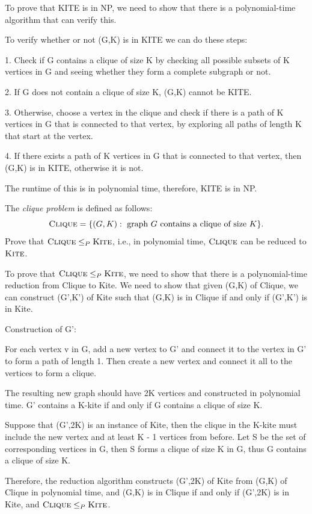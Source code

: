 \documentclass[12pt]{article}
\newcommand{\KITE}{\textsf{\sc Kite}}
\newcommand{\CLIQUE}{\textsf{\sc Clique}}
\newcounter{ques}
\newenvironment{question}{\stepcounter{ques}{\noindent\bf Question \arabic{ques}:}}{\vspace{5mm}}
\newenvironment{solution}{{\noindent\bf Solution:}}{\vspace{5mm}}
\begin{document}
\begin{solution}
      
      To prove that KITE is in NP, we need to show that there is a polynomial-time algorithm
      that can verify this.

      To verify whether or not (G,K) is in KITE we can do these steps:

      1. Check if G contains a clique of size K by checking all possible subsets
      of K vertices in G and seeing whether they form a complete subgraph or not.

      2. If G does not contain a clique of size K, (G,K) cannot be KITE.

      3. Otherwise, choose a vertex in the clique and check if
      there is a path of K vertices in G that is connected to that vertex,
      by exploring all paths of length K that start at the vertex.

      4. If there exists a path of K vertices in G that is connected to that
      vertex, then (G,K) is in KITE, otherwise it is not.

      The runtime of this is in polynomial time, therefore, KITE is in NP.

\end{solution}

\begin{question}
The \emph{clique problem} is defined as follows:
\[ \CLIQUE= \{ (G,K) : \mbox{ graph $G$ contains a clique of size $K$} 
            \} . 
\]
Prove that $\CLIQUE \leq_P \KITE$, i.e., in polynomial time, $\CLIQUE$ 
can be reduced to $\KITE$.
\end{question}

\begin{solution}
      
      To prove that $\CLIQUE \leq_P \KITE$, we need to show that there is a
      polynomial-time reduction from Clique to Kite. We need to show that given
      (G,K) of Clique, we can construct (G',K') of Kite such that (G,K) is in Clique
      if and only if (G',K') is in Kite.

      Construction of G':
      
      For each vertex v in G, add a new vertex to G' and connect it to the
      vertex in G' to form a path of length 1.
      Then create a new vertex and connect it all to the vertices to form a clique.

      The resulting new graph should have 2K vertices and constructed in polynomial time.
      G' contains a K-kite if and only if G contains a clique of size K.

      Suppose that (G',2K) is an instance of Kite, then the clique in the K-kite must include
      the new vertex and at least K - 1 vertices from before. Let S be the set of corresponding
      vertices in G, then S forms a clique of size K in G, thus G contains a clique of size K.

      Therefore, the reduction algorithm constructs (G',2K) of Kite from (G,K) of Clique
      in polynomial time, and (G,K) is in Clique if and only if (G',2K) is in Kite, and
      $\CLIQUE \leq_P \KITE$.
\end{solution}
\end{document}

